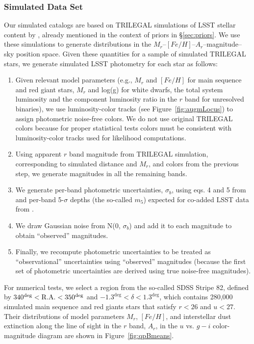 \subsubsection{Simulated Data Set}
 
Our simulated catalogs are based on TRILEGAL simulations of LSST stellar content by \cite{2022ApJS..262...22D}, already
mentioned in the context of priors in \S\ref{sec:priors}. We use these simulations to generate distributions in the
$M_r$--$[Fe/H]$--$A_r$--magnitude--sky position space. Given these quantities for a sample of simulated TRILEGAL stars,
we generate simulated LSST photometry for each star as follows: 
\begin{enumerate}
\item
Given relevant model parameters (e.g., $M_r$ and $[Fe/H]$ for main sequence and red giant stars, $M_r$ and log(g) for
white dwarfs, the total system luminosity and the component luminosity ratio in the $r$ band for unresolved binaries),
we use luminosity-color tracks (see Figure~\ref{fig:augmLocus}) to
assign photometric noise-free colors. We do not use original TRILEGAL
colors because for proper statistical tests colors must be consistent
with luminosity-color tracks used for likelihood computations. 
\item
Using apparent $r$ band magnitude from TRILEGAL simulation, corresponding to simulated distance and $M_r$, and 
colors from the previous step, we generate magnitudes in all the remaining bands.
\item
We generate per-band photometric uncertainties, $\sigma_b$, using eqs. 4 and 5 from \cite{2019ApJ...873..111I} and
per-band 5-$\sigma$ depths (the so-called $m_5$) expected for co-added LSST data from \cite{2022ApJS..258....1B}.
\item
We draw Gaussian noise from N(0, $\sigma_b$) and add it to each magnitude to obtain ``observed'' magnitudes.   
\item
Finally, we recompute photometric uncertainties to be treated as ``observational'' uncertainties using ``observed'' magnitudes
(because the first set of photometric uncertainties are derived using true noise-free magnitudes). 
\end{enumerate} 

For numerical tests, we select a region from the so-called SDSS Stripe 82, defined by $340^{\deg} < {\rm R.A.} < 350^{\deg}$ and
$-1.3^{\deg} < \delta < 1.3^{\deg}$, which contains 280,000 simulated main sequence and red giants stars that satisfy
$r<26$ and $u<27$. Their distributions of model parameters $M_r$, $[Fe/H]$, and interstellar dust extinction along the line of sight in
the $r$ band, $A_r$,  in the $u$ vs. $g-i$ color-magnitude diagram are shown in Figure~\ref{fig:qpBmeans}. 


